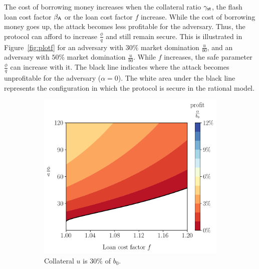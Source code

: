  The cost of borrowing money increases when the collateral ratio
 $\gamma_{\textsf{st}}$, the flash loan cost factor $\beta_{\textsf{A}}$ or the loan cost factor $f$
 increase. While the cost of borrowing money goes up, the attack becomes less profitable
 for the adversary. Thus, the protocol can afford to increase $\frac{\phi}{q}$
 and still remain secure. This is illustrated in
 Figure~\ref{fig:plotf} for an adversary with $30\%$ market domination $\frac{u}{b0}$,
 and an adversary with $50\%$ market domination $\frac{u}{b0}$.
 While $f$ increases, the safe parameter $\frac{\phi}{q}$ can increase with it.
 The black line indicates where the attack becomes unprofitable for the adversary ($\alpha = 0$).
 The white area under the black line represents the configuration in which
 the protocol is secure in the rational model.

 \begin{figure}[htb]
   \centering
   \begin{subfigure}{0.49\textwidth}
     \includegraphics[width=\textwidth]{./plots/plotf30.pdf}
     \caption{Collateral $u$ is $30\%$ of $b_0$.}
     \label{fig:plotf30}
   \end{subfigure}
   \hfill
   \begin{subfigure}{0.49\textwidth}

\end{subfigure}
\end{figure}
